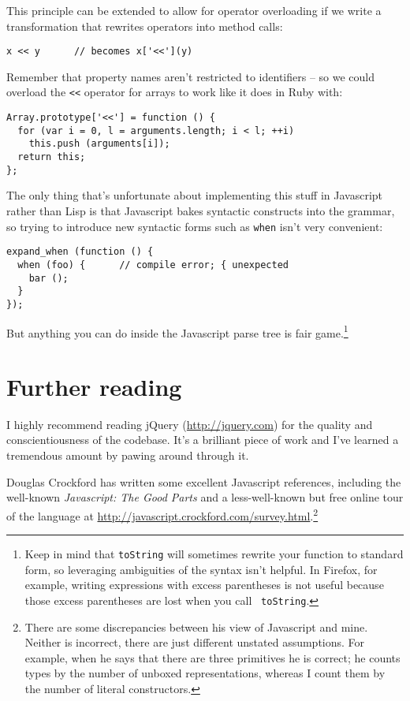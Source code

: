 \documentclass{article}
\begin{document}
    This principle can be extended to allow for operator overloading if we write a transformation that rewrites operators into method calls:

\begin{verbatim}
x << y      // becomes x['<<'](y)
\end{verbatim}

    Remember that property names aren't restricted to identifiers -- so we could overload the \verb|<<| operator for arrays to work like it does in Ruby with:

\begin{verbatim}
Array.prototype['<<'] = function () {
  for (var i = 0, l = arguments.length; i < l; ++i)
    this.push (arguments[i]);
  return this;
};
\end{verbatim}

    The only thing that's unfortunate about implementing this stuff in Javascript rather than Lisp is that Javascript bakes syntactic constructs into the grammar, so trying to introduce new
    syntactic forms such as \verb|when| isn't very convenient:

\begin{verbatim}
expand_when (function () {
  when (foo) {      // compile error; { unexpected
    bar ();
  }
});
\end{verbatim}

    But anything you can do inside the Javascript parse tree is fair game.\footnote{Keep in mind that {\tt toString} will sometimes rewrite your function to standard form, so leveraging
    ambiguities of the syntax isn't helpful. In Firefox, for example, writing expressions with excess parentheses is not useful because those excess parentheses are lost when you call {\tt
    toString}.}

\section {Further reading}
  I highly recommend reading jQuery (\url{http://jquery.com}) for the quality and conscientiousness of the codebase. It's a brilliant piece of work and I've learned a tremendous amount by
  pawing around through it.

  Douglas Crockford has written some excellent Javascript references, including the well-known {\it Javascript: The Good Parts} and a less-well-known but free online tour of the language at
  \url{http://javascript.crockford.com/survey.html}.\footnote{There are some discrepancies between his view of Javascript and mine. Neither is incorrect, there are just different unstated
  assumptions. For example, when he says that there are three primitives he is correct; he counts types by the number of unboxed representations, whereas I count them by the number of literal
  constructors.}
\end{document}

